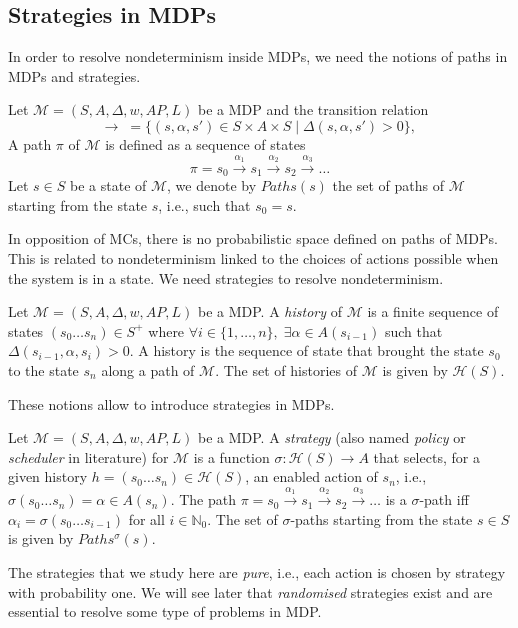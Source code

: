 \subsection{Strategies in MDPs}
In order to resolve nondeterminism inside MDPs, we need the notions of paths in MDPs and strategies.
\begin{definition}
  Let $\mathcal{M}=(S, A, \Delta, w, AP, L)$ be a MDP and the transition relation
  \[\rightarrow \; =  \{ (s, \alpha, s') \in S \times A \times S \; | \; \Delta(s, \alpha, s') > 0 \}, \,\]
	A path $\pi$ of $\mathcal{M}$ is defined as a sequence of states
	\[ \pi = s_0 \xrightarrow{\alpha_1} s_1 \xrightarrow{\alpha_2} s_2 \xrightarrow{\alpha_3} \dots \]
	Let $s \in S$ be a state of $\mathcal{M}$, we denote by $Paths(s)$ the set of
	paths of $\mathcal{M}$ starting from the state $s$, i.e., such that $s_0 = s$.
\end{definition}
In opposition of MCs, there is no probabilistic space defined on paths of MDPs.
This is related to nondeterminism linked to the choices of actions possible when the system is in a state. We need strategies to resolve nondeterminism.
\begin{definition}
	Let $\mathcal{M} = (S, A, \Delta, w, AP, L)$ be a MDP. A \textit{history} of $\mathcal{M}$
	is a finite sequence of states $(s_0 \dots s_n) \in S^+$ where
	$\forall i \in \{1, \dots, n \}, \; \exists \alpha \in A(s_{i-1})$ such that $\Delta(s_{i-1}, \alpha, s_i) > 0$.
	A history is the sequence of state that brought the state $s_0$ to the state $s_n$ along a path of $\mathcal{M}$. The set of histories of $\mathcal{M}$  is given by $\mathcal{H}(S)$.
\end{definition}

These notions allow to introduce strategies in MDPs.

\begin{definition}
Let $\mathcal{M} = (S, A, \Delta, w, AP, L)$ be a MDP. A \textit{strategy} (also named \textit{policy} or \textit{scheduler} in literature) for $\mathcal{M}$
	is a function
	$\sigma : \mathcal{H}(S) \rightarrow A$
	that selects, for a given history $h = (s_0 \dots s_n) \in \mathcal{H}(S)$, an enabled action of $s_n$, i.e., $\sigma(s_0 \dots s_n) = \alpha \in A(s_n)$.
	The path $\pi = s_0 \xrightarrow{\alpha_1} s_1 \xrightarrow{\alpha_2} s_2 \xrightarrow{\alpha_3} \dots$
	is a $\sigma$-path iff $\alpha_i = \sigma(s_0 \dots s_{i-1})$
	for all $i \in \mathbb{N}_0$. The set of $\sigma$-paths starting from the state $s \in S$ is given by $Paths^\sigma(s)$.
\end{definition}
The strategies that we study here are \textit{pure}, i.e., each action is chosen by strategy with probability one. We will see later that \textit{randomised} strategies exist and are essential to resolve some type of problems in MDP. \\

